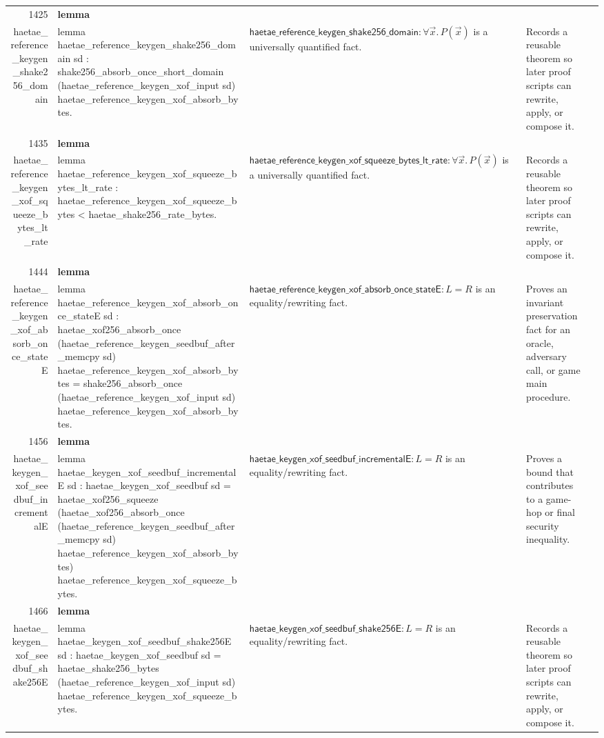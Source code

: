 \documentclass[10pt]{article}
\newcommand{\ec}[1]{\begingroup\ttfamily\scriptsize #1\endgroup}
\begin{document}
\begin{longtable}{r L{0.17\textwidth} L{0.26\textwidth} L{0.27\textwidth} L{0.20\textwidth}}
1425 & \textbf{lemma}\\\ec{haetae\_reference\_keygen\_shake256\_domain} & \ec{lemma haetae\_reference\_keygen\_shake256\_domain sd : shake256\_absorb\_once\_short\_domain (haetae\_reference\_keygen\_xof\_input sd) haetae\_reference\_keygen\_xof\_absorb\_bytes.} & \(\mathsf{haetae\_reference\_keygen\_shake256\_domain} : \forall \vec{x}.\, P(\vec{x})\) is a universally quantified fact. & Records a reusable theorem so later proof scripts can rewrite, apply, or compose it. \\
1435 & \textbf{lemma}\\\ec{haetae\_reference\_keygen\_xof\_squeeze\_bytes\_lt\_rate} & \ec{lemma haetae\_reference\_keygen\_xof\_squeeze\_bytes\_lt\_rate : haetae\_reference\_keygen\_xof\_squeeze\_bytes < haetae\_shake256\_rate\_bytes.} & \(\mathsf{haetae\_reference\_keygen\_xof\_squeeze\_bytes\_lt\_rate} : \forall \vec{x}.\, P(\vec{x})\) is a universally quantified fact. & Records a reusable theorem so later proof scripts can rewrite, apply, or compose it. \\
1444 & \textbf{lemma}\\\ec{haetae\_reference\_keygen\_xof\_absorb\_once\_stateE} & \ec{lemma haetae\_reference\_keygen\_xof\_absorb\_once\_stateE sd : haetae\_xof256\_absorb\_once (haetae\_reference\_keygen\_seedbuf\_after\_memcpy sd) haetae\_reference\_keygen\_xof\_absorb\_bytes = shake256\_absorb\_once (haetae\_reference\_keygen\_xof\_input sd) haetae\_reference\_keygen\_xof\_absorb\_bytes.} & \(\mathsf{haetae\_reference\_keygen\_xof\_absorb\_once\_stateE} : L = R\) is an equality/rewriting fact. & Proves an invariant preservation fact for an oracle, adversary call, or game main procedure. \\
1456 & \textbf{lemma}\\\ec{haetae\_keygen\_xof\_seedbuf\_incrementalE} & \ec{lemma haetae\_keygen\_xof\_seedbuf\_incrementalE sd : haetae\_keygen\_xof\_seedbuf sd = haetae\_xof256\_squeeze (haetae\_xof256\_absorb\_once (haetae\_reference\_keygen\_seedbuf\_after\_memcpy sd) haetae\_reference\_keygen\_xof\_absorb\_bytes) haetae\_reference\_keygen\_xof\_squeeze\_bytes.} & \(\mathsf{haetae\_keygen\_xof\_seedbuf\_incrementalE} : L = R\) is an equality/rewriting fact. & Proves a bound that contributes to a game-hop or final security inequality. \\
1466 & \textbf{lemma}\\\ec{haetae\_keygen\_xof\_seedbuf\_shake256E} & \ec{lemma haetae\_keygen\_xof\_seedbuf\_shake256E sd : haetae\_keygen\_xof\_seedbuf sd = haetae\_shake256\_bytes (haetae\_reference\_keygen\_xof\_input sd) haetae\_reference\_keygen\_xof\_squeeze\_bytes.} & \(\mathsf{haetae\_keygen\_xof\_seedbuf\_shake256E} : L = R\) is an equality/rewriting fact. & Records a reusable theorem so later proof scripts can rewrite, apply, or compose it. \\

\end{longtable}
\end{document}
